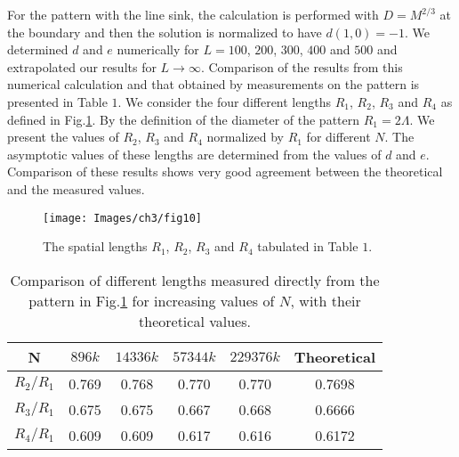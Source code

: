 \documentclass[11pt,a4paper]{book}
\begin{document}
For the pattern with the line sink, the calculation is performed with $D=M^{2/3}$ at the
boundary and then the solution is normalized to have $d\left( 1,0 \right)=-1$.
We determined $d$ and $e$ numerically for $L=100$, $200$, $300$, $400$ and $500$ and
extrapolated our results for $L\rightarrow \infty$. 
Comparison of the results from this numerical calculation and that obtained by
measurements on the pattern is presented in Table $1$. 
We consider the four different lengths $R_{1}$, $R_{2}$, $R_{3}$ and $R_{4}$ as
defined in Fig.\ref{fig:LSlengths}. By the
definition of the diameter of the pattern $R_{1}=2\Lambda$. We present the values
of $R_{2}$, $R_{3}$ and $R_{4}$ normalized by $R_{1}$ for different $N$. The asymptotic values of these lengths
are determined from the values of $d$ and $e$. Comparison of these results
shows very good agreement between the theoretical and the measured values.
\begin{figure}
\begin{center}
\texttt{[image: Images/ch3/fig10]}
\end{center}
\caption{ The spatial lengths $R_{1}$, $R_{2}$, $R_{3}$ and $R_{4}$ tabulated in Table $1$.}
\label{fig:LSlengths}
\end{figure}
\begin{table}
  \begin{center}
    \begin{tabular}{|c||c|c|c|c|c|}
      \hline
      ~N~ & $896k$ & $14336k$ & $57344k$ & $229376k$ & Theoretical \\
      \hline
      \hline
      $R_{2}/R_{1}$ & 0.769 & 0.768 & 0.770 & 0.770 & 0.7698  \\
      \hline
      $R_{3}/R_{1}$ & 0.675 & 0.675 & 0.667 & 0.668 & 0.6666 \\
      \hline
      $R_{4}/R_{1}$ & 0.609 & 0.609 & 0.617 & 0.616 & 0.6172 \\
      \hline
    \end{tabular}
    \caption{Comparison of different lengths measured directly from the pattern in Fig.\ref{fig:LSlengths}
for increasing values of $N$, with their theoretical values.}
  \end{center}
  \label{table:first}
\end{table}
\end{document}
